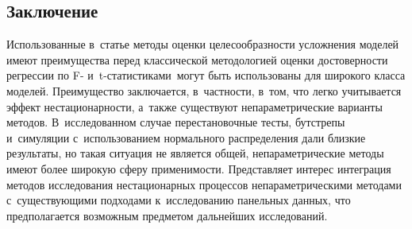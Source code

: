\begin{multicols}{2}

\section{Заключение}

  Использованные в~статье методы оценки целесообразности усложнения моделей 
имеют преимущества перед классической методологией оценки достоверности регрессии 
по F- и~t-ста\-ти\-сти\-кам\linebreak и~могут быть использованы для широкого класса моделей. 
Преимущество заключается, в~част\-ности, в~том, что легко учитывается эффект 
нестационарности, а~также существуют \mbox{непараметрические} варианты методов. 
В~исследованном случае перестановочные тесты, бутстрепы и~симуляции 
с~\mbox{использованием} нормального распределения дали близкие результаты, но такая 
ситуация не является общей, непараметрические методы имеют более широкую сферу 
применимости. Представляет интерес интеграция методов исследования нестационарных 
процессов непараметрическими методами с~существующими подходами 
к~исследованию панельных данных, что предполагается возможным предметом 
дальнейших исследований.
  
{\small\frenchspacing
 {%
 \begin{thebibliography}{99}
  

\end{thebibliography}}}
\end{multicols}
